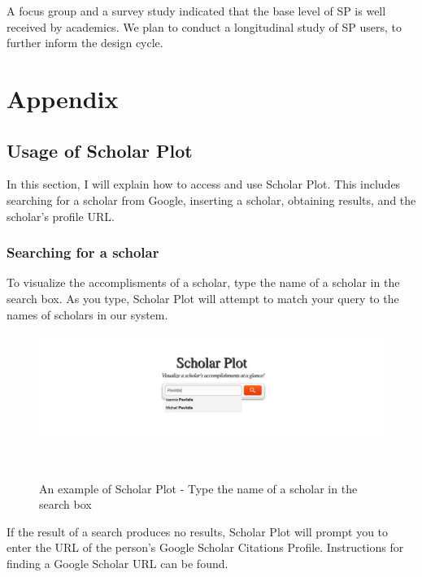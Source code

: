 A focus group and a survey study indicated that the base level of SP is well received by academics. We plan to conduct a longitudinal study of SP users, to further inform the design cycle.




\chapter{Appendix}


\section{Usage of Scholar Plot}
In this section, I will explain how to access and use Scholar Plot. This includes searching for a scholar from Google, inserting a scholar, obtaining results, and the scholar's profile URL.

\subsection{Searching for a scholar}
To visualize the accomplisments of a scholar, type the name of a scholar in the search box. As you type, Scholar Plot will attempt to match your query to the names of scholars in our system.

\begin{figure}[hb]
  \centering
  \includegraphics[width=1\textwidth]{figures/Support-3}
  \caption{An example of Scholar Plot - Type the name of a scholar in the search box}~\label{fig:Support-3}
\end{figure}

If the result of a search produces no results, Scholar Plot will prompt you to enter the URL of the person's Google Scholar Citations Profile. Instructions for finding a Google Scholar URL can be found.


